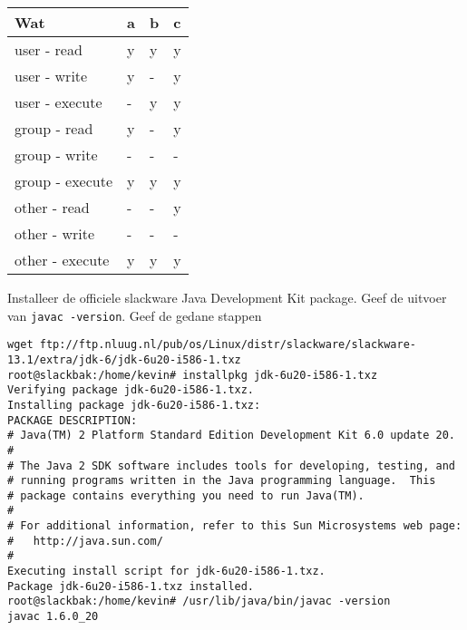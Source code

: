 \begin{solution}
\begin{tabular}[t]{llll}
  Wat & a & b & c\\
  \hline
  user - read & y & y & y\\
  user - write & y & - & y\\
  user - execute & - & y & y\\
  group - read & y & - & y\\
  group - write & - & - & -\\
  group - execute & y & y & y\\
  other - read & - & - & y\\
  other - write & - & - & -\\
  other - execute & y & y & y\\
\end{tabular}
\end{solution}

\question[10] Installeer de officiele slackware Java Development Kit package. Geef de uitvoer van \texttt{javac -version}. Geef de gedane stappen
\begin{solution}
\begin{lstlisting}
wget ftp://ftp.nluug.nl/pub/os/Linux/distr/slackware/slackware-13.1/extra/jdk-6/jdk-6u20-i586-1.txz
root@slackbak:/home/kevin# installpkg jdk-6u20-i586-1.txz 
Verifying package jdk-6u20-i586-1.txz.
Installing package jdk-6u20-i586-1.txz:
PACKAGE DESCRIPTION:
# Java(TM) 2 Platform Standard Edition Development Kit 6.0 update 20.
#
# The Java 2 SDK software includes tools for developing, testing, and
# running programs written in the Java programming language.  This
# package contains everything you need to run Java(TM).
#
# For additional information, refer to this Sun Microsystems web page:
#   http://java.sun.com/
#
Executing install script for jdk-6u20-i586-1.txz.
Package jdk-6u20-i586-1.txz installed.
root@slackbak:/home/kevin# /usr/lib/java/bin/javac -version
javac 1.6.0_20
\end{lstlisting}
\end{solution}

